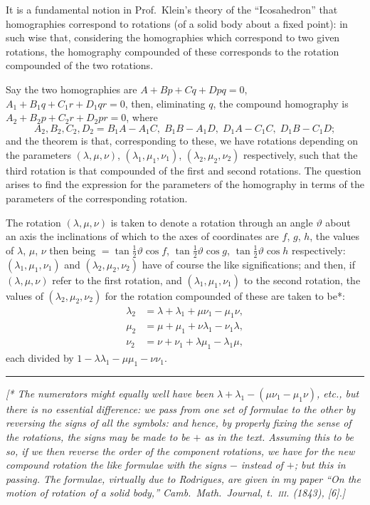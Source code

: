 \documentclass[11pt,a4paper]{article}
\theoremstyle{plain}
\theoremstyle{definition}
\begin{document}
\medskip

It is a fundamental notion in Prof.~Klein's theory of the ``Icosahedron'' that homographies correspond to rotations (of a solid body about a fixed point): in such wise that, considering the homographies which correspond to two given rotations, the homography compounded of these corresponds to the rotation compounded of the two rotations.

Say the two homographies are $A + Bp + Cq + Dpq = 0$, $A_1 + B_1 q + C_1 r + D_1 qr = 0$, then, eliminating $q$, the compound homography is $A_2 + B_2 p + C_2 r + D_2 pr = 0$, where
\[
A_2, B_2, C_2, D_2 = B_1 A - A_1 C, \; B_1 B - A_1 D, \; D_1 A - C_1 C, \; D_1 B - C_1 D;
\]
and the theorem is that, corresponding to these, we have rotations depending on the parameters $(\lambda, \mu, \nu)$, $(\lambda_1, \mu_1, \nu_1)$, $(\lambda_2, \mu_2, \nu_2)$ respectively, such that the third rotation is that compounded of the first and second rotations. The question arises to find the expression for the parameters of the homography in terms of the parameters of the corresponding rotation.

The rotation $(\lambda, \mu, \nu)$ is taken to denote a rotation through an angle $\vartheta$ about an axis the inclinations of which to the axes of coordinates are $f$, $g$, $h$, the values of $\lambda$, $\mu$, $\nu$ then being $= \tan\frac{1}{2}\vartheta \cos f$, $\tan\frac{1}{2}\vartheta \cos g$, $\tan\frac{1}{2}\vartheta \cos h$ respectively: $(\lambda_1, \mu_1, \nu_1)$ and $(\lambda_2, \mu_2, \nu_2)$ have of course the like significations; and then, if $(\lambda, \mu, \nu)$ refer to the first rotation, and $(\lambda_1, \mu_1, \nu_1)$ to the second rotation, the values of $(\lambda_2, \mu_2, \nu_2)$ for the rotation compounded of these are taken to be*:
\begin{align*}
\lambda_2 &= \lambda + \lambda_1 + \mu\nu_1 - \mu_1\nu, \\
\mu_2 &= \mu + \mu_1 + \nu\lambda_1 - \nu_1\lambda, \\
\nu_2 &= \nu + \nu_1 + \lambda\mu_1 - \lambda_1\mu,
\end{align*}
each divided by $1 - \lambda\lambda_1 - \mu\mu_1 - \nu\nu_1$.

\smallskip
\noindent\rule{0.4\textwidth}{0.4pt}

\noindent\textit{[* The numerators might equally well have been $\lambda + \lambda_1 - (\mu\nu_1 - \mu_1\nu)$, etc., but there is no essential difference: we pass from one set of formulae to the other by reversing the signs of all the symbols: and hence, by properly fixing the sense of the rotations, the signs may be made to be $+$ as in the text. Assuming this to be so, if we then reverse the order of the component rotations, we have for the new compound rotation the like formulae with the signs $-$ instead of $+$; but this in passing. The formulae, virtually due to Rodrigues, are given in my paper ``On the motion of rotation of a solid body,'' \emph{Camb.~Math.~Journal}, t.~\textsc{iii}. (1843), [6].]}
\end{document}
